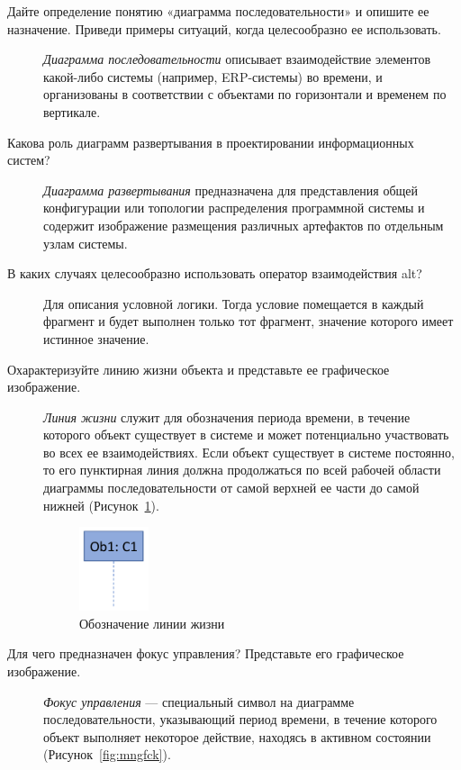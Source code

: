 \begin{description}
	\item[Дайте определение понятию «диаграмма последовательности» и опишите
		ее назначение. Приведи примеры ситуаций, когда целесообразно ее
		использовать.]
		\textit{Диаграмма последовательности} описывает взаимодействие
		элементов какой-либо системы (например, ERP-системы) во времени,
		и организованы в соответствии с объектами по горизонтали и временем
		по вертикале.
	\item[Какова роль диаграмм развертывания в проектировании информационных
		систем?]
		\textit{Диаграмма развертывания} предназначена для
		представления общей конфигурации или топологии распределения
		программной системы и содержит изображение размещения различных
		артефактов по отдельным узлам системы.
	\item[В каких случаях целесообразно использовать оператор
		взаимодействия alt?]
		Для описания условной логики. Тогда условие помещается в каждый
		фрагмент и будет выполнен только тот фрагмент, значение
		которого имеет истинное значение.
	\item[Охарактеризуйте линию жизни объекта и представьте ее графическое
		изображение.]
		\textit{Линия жизни} служит для обозначения периода времени, в
		течение которого объект существует в системе и может
		потенциально участвовать во всех ее взаимодействиях. Если
		объект существует в системе постоянно, то его пунктирная
		линия должна продолжаться по всей рабочей области
		диаграммы последовательности от самой верхней ее части до
		самой нижней (Рисунок~\ref{fig:lineLive}).
		\begin{figure}[h!tp]
			\centering
			\includegraphics[width=0.2\textwidth]{Screenshot from 2023-03-18 18-02-21.png}
			\caption{Обозначение линии жизни}
			\label{fig:lineLive}
		\end{figure}
	\item[Для чего предназначен фокус управления? Представьте его графическое
		изображение.]
		\textit{Фокус управления} --- специальный
		символ на диаграмме последовательности,
		указывающий период времени, в течение которого
		объект выполняет некоторое действие, находясь в
		активном состоянии (Рисунок~\ref{fig:mngfck}).

\end{description}
